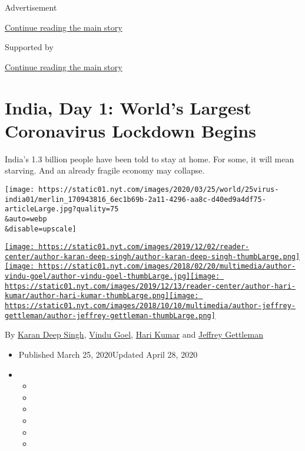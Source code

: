 Advertisement

\protect\hyperlink{after-top}{Continue reading the main story}

Supported by

\protect\hyperlink{after-sponsor}{Continue reading the main story}

\hypertarget{india-day-1-worlds-largest-coronavirus-lockdown-begins}{%
\section{India, Day 1: World's Largest Coronavirus Lockdown
Begins}\label{india-day-1-worlds-largest-coronavirus-lockdown-begins}}

India's 1.3 billion people have been told to stay at home. For some, it
will mean starving. And an already fragile economy may collapse.

\texttt{[image: https://static01.nyt.com/images/2020/03/25/world/25virus-india01/merlin\_170943816\_6ec1b69b-2a11-4296-aa8c-d40ed9a4df75-articleLarge.jpg?quality=75\\\&auto=webp\\\&disable=upscale]}

\href{https://www.nytimes.com/by/karan-deep-singh}{\texttt{[image: https://static01.nyt.com/images/2019/12/02/reader-center/author-karan-deep-singh/author-karan-deep-singh-thumbLarge.png]}}\href{https://www.nytimes.com/by/vindu-goel}{\texttt{[image: https://static01.nyt.com/images/2018/02/20/multimedia/author-vindu-goel/author-vindu-goel-thumbLarge.jpg]}}\href{https://www.nytimes.com/by/hari-kumar}{\texttt{[image: https://static01.nyt.com/images/2019/12/13/reader-center/author-hari-kumar/author-hari-kumar-thumbLarge.png]}}\href{https://www.nytimes.com/by/jeffrey-gettleman}{\texttt{[image: https://static01.nyt.com/images/2018/10/10/multimedia/author-jeffrey-gettleman/author-jeffrey-gettleman-thumbLarge.png]}}

By \href{https://www.nytimes.com/by/karan-deep-singh}{Karan Deep Singh},
\href{https://www.nytimes.com/by/vindu-goel}{Vindu Goel},
\href{https://www.nytimes.com/by/hari-kumar}{Hari Kumar} and
\href{https://www.nytimes.com/by/jeffrey-gettleman}{Jeffrey Gettleman}

\begin{itemize}
\item
  Published March 25, 2020Updated April 28, 2020
\item
  \begin{itemize}
  \item
  \item
  \item
  \item
  \item
  \item
  \end{itemize}
\end{itemize}

